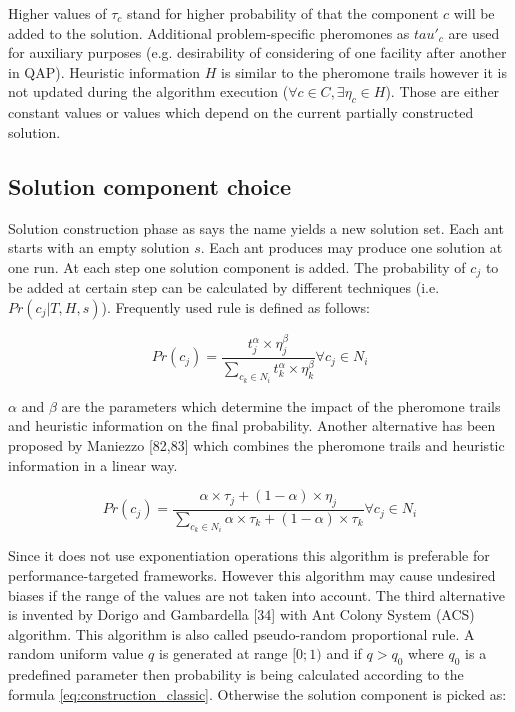 Higher values of $\tau_c$ stand for higher probability of that the component $c$ will be added to the solution. Additional problem-specific pheromones as $tau'_c$ are used for auxiliary purposes (e.g. desirability of considering of one facility after another in QAP). Heuristic information $H$ is similar to the pheromone trails however it is not updated during the algorithm execution ($\forall c \in C, \exists \eta_c \in H$). Those are either constant values or values which depend on the current partially constructed solution.

\subsection{Solution component choice}

Solution construction phase as says the name yields a new solution set. Each ant starts with an empty solution $s$. Each ant produces may produce one solution at one run. At each step one solution component is added. The probability of $c_j$ to be added at certain step can be calculated by different techniques (i.e. $Pr(c_j|T,H,s)$). Frequently used rule is defined as follows:

\begin{equation}
Pr(c_j)=\frac{t_j^\alpha \times \eta_j^\beta}{\sum \limits_{c_k \in N_i} t_k^\alpha \times \eta_k^\beta} \forall c_j \in N_i
\label{eq:construction_classic}
\end{equation}

$\alpha$ and $\beta$ are the parameters which determine the impact of the pheromone trails and heuristic information on the final probability. Another alternative has been proposed by Maniezzo [82,83] which combines the pheromone trails and heuristic information in a linear way.

\begin{equation}
Pr(c_j)=\frac{\alpha \times \tau_j + (1-\alpha) \times \eta_j}{\sum \limits_{c_k \in N_i} \alpha \times \tau_k + (1-\alpha) \times \tau_k} \forall c_j \in N_i
\end{equation}

Since it does not use exponentiation operations this algorithm is preferable for performance-targeted frameworks. However this algorithm may cause undesired biases if the range of the values are not taken into account. The third alternative is invented by Dorigo and Gambardella [34] with Ant Colony System (ACS) algorithm. This algorithm is also called pseudo-random proportional rule. A random uniform value $q$ is generated at range $[0;1)$ and if $q>q_0$ where $q_0$ is a predefined parameter then probability is being calculated according to the formula \eqref{eq:construction_classic}. Otherwise the solution component is picked as:

